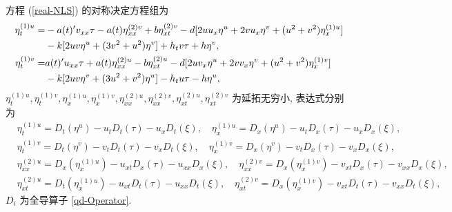 方程 (\ref{real-NLS}) 的对称决定方程组为
\begin{align}
\eta^{(1)u}_t=&-a(t)'v_{xx}\tau-a(t)\eta^{(2)v}_{xx}+b\eta^{(2)v}_{xt}
-d[2uu_x\eta^u+2vu_x\eta^v+(u^2+v^2)\eta^{(1)u}_x]\notag\\
&-k[2uv\eta^u+(3v^2+u^2)\eta^v]+h_tv\tau+h\eta^v,\\
\eta^{(1)v}_t=&a(t)'u_{xx}\tau+a(t)\eta^{(2)u}_{xx}-b\eta^{(2)u}_{xt}
-d[2uv_x\eta^u+2vv_x\eta^v+(u^2+v^2)\eta^{(1)v}_x]\notag\\
&-k[2uv\eta^v+(3u^2+v^2)\eta^u]-h_tu\tau-h\eta^u,
\end{align}
$\eta^{(1)u}_t, \eta^{(1)v}_t, \eta^{(1)u}_x, \eta^{(1)v}_x, \eta^{(2)u}_{xx}, \eta^{(2)v}_{xx}, \eta^{(2)u}_{xt}, \eta^{(2)v}_{xt}$ 为延拓无穷小, 表达式分别为
\begin{align*}
&\eta_t^{(1)u}=D_t(\eta^u)-u_tD_t(\tau)-u_xD_t(\xi),\quad \eta_x^{(1)u}=D_x(\eta^u)-u_tD_x(\tau)-u_xD_x(\xi),\\
&\eta_t^{(1)v}=D_t(\eta^v)-v_tD_t(\tau)-v_xD_t(\xi),\quad \eta_x^{(1)v}=D_x(\eta^v)-v_tD_x(\tau)-v_xD_x(\xi),\\
&\eta_{xx}^{(2)u}=D_x(\eta_x^{(1)u})-u_{xt}D_x(\tau)-u_{xx}D_x(\xi),\quad \eta_{xx}^{(2)v}=D_x(\eta_x^{(1)v})-v_{xt}D_x(\tau)-v_{xx}D_x(\xi),\\ &\eta_{xt}^{(2)u}=D_t(\eta_x^{(1)u})-u_{xt}D_t(\tau)-u_{xx}D_t(\xi),\quad \eta_{xt}^{(2)v}=D_x(\eta_x^{(1)v})-v_{xt}D_t(\tau)-v_{xx}D_t(\xi),
\end{align*}
$D_i$ 为全导算子 \eqref{qd-Operator}.

